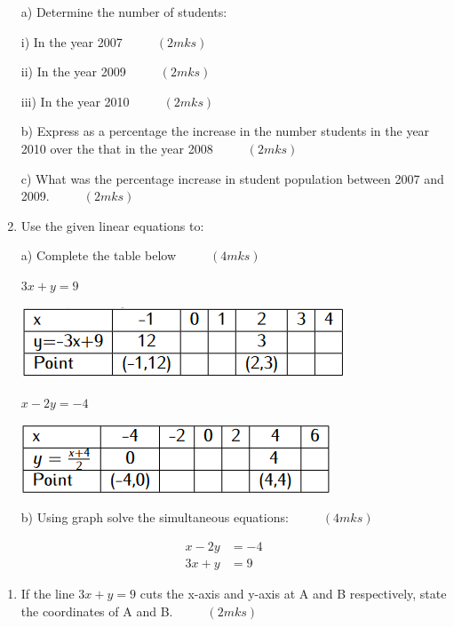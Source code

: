 \documentclass[
  a4paperpaper,
]{scrbook}
\providecommand{\tightlist}{%
  \setlength{\itemsep}{0pt}\setlength{\parskip}{0pt}}\usepackage{longtable,booktabs,array}
\begin{document}
\begin{tcolorbox}
\begin{enumerate}
  a) Determine the number of students:

  i) In the year 2007 \(\hspace{1cm} (2mks)\)

  ii) In the year 2009 \(\hspace{1cm} (2mks)\)

  iii) In the year 2010 \(\hspace{1cm} (2mks)\)

  b) Express as a percentage the increase in the number students in the
  year 2010 over the that in the year 2008 \(\hspace{1cm} (2mks)\)

  c) What was the percentage increase in student population between 2007
  and 2009. \(\hspace{1cm}(2mks)\)
\item
  Use the given linear equations to:

  a) Complete the table below \(\hspace{1cm} (4mks)\)

  \(3x+y=9\)

  \includegraphics{figures/Md7_Q20a.png}

  \(x-2y=-4\)

  \includegraphics{figures/Md7_Q20b.png}

  b) Using graph solve the simultaneous equations:
  \(\hspace{1cm} (4mks)\)
\end{enumerate}

\[
\begin{split}
x-2y&= -4\\
3x+y&=9
\end {split}
\]

\begin{enumerate}
\def\labelenumi{\alph{enumi})}
\setcounter{enumi}{2}
\tightlist
\item
  If the line \(3x+y= 9\) cuts the x-axis and y-axis at A and B
  respectively, state the coordinates of A and B.
  \(\hspace{1cm} (2mks)\)
\end{enumerate}


\end{tcolorbox}
\end{document}
